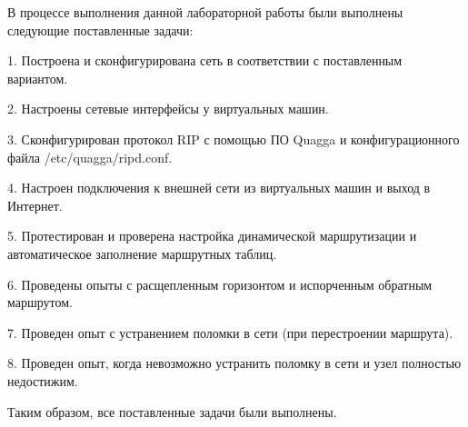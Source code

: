 \documentclass[a4paper,12pt]{article}
\begin{document}
В процессе выполнения данной лабораторной работы были выполнены следующие поставленные задачи:

1. Построена и сконфигурирована сеть в соответствии с поставленным вариантом.

2. Настроены сетевые интерфейсы у виртуальных машин.

3. Сконфигурирован протокол RIP с помощью ПО Quagga и конфигурационного файла /etc/quagga/ripd.conf.

4. Настроен подключения к внешней сети из виртуальных машин и выход в Интернет.

5. Протестирован и проверена настройка динамической маршрутизации и автоматическое заполнение маршрутных таблиц.

6. Проведены опыты с расщепленным горизонтом и испорченным обратным маршрутом.

7. Проведен опыт с устранением поломки в сети (при перестроении маршрута).

8. Проведен опыт, когда невозможно устранить поломку в сети и узел полностью недостижим.

Таким образом, все поставленные задачи были выполнены.
\end{document}
